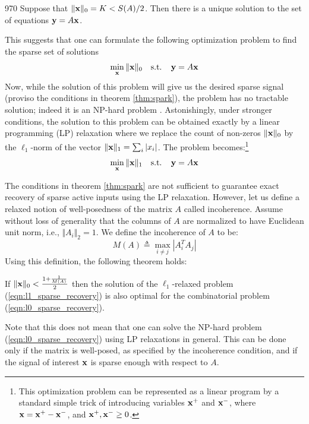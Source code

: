 \begin{theorem}
970\label{thm:spark}
Suppose that $\Vert \mathbf{x} \Vert_0 = K < S(A) / 2$. Then there is a unique solution to the
set of equations $\mathbf{y} = A \mathbf{x}$.
\end{theorem}

This suggests that one can formulate the following optimization problem to find the sparse set of solutions
\begin{equation}
\label{eqn:l0_sparse_recovery}
\min_{\mathbf{x}} \Vert \mathbf{x} \Vert_0  ~~\mbox{ s.t. }~~ \mathbf{y} = A \mathbf{x}
\end{equation}
Now, while the solution of this problem will give us the desired sparse signal (proviso the conditions in
theorem \ref{thm:spark}), the problem has no tractable solution; indeed it is an NP-hard problem \cite{natarajan1995sparse_recovery_complexity}. Astonishingly, under stronger conditions, the solution to this problem can be obtained exactly by a linear
programming (LP) relaxation where we replace the count of non-zeros $\Vert \mathbf{x} \Vert_0$  by the $\ell_1$-norm
of the vector $\Vert \mathbf{x} \Vert_1 = \sum_i | x_i|$. The problem becomes:\footnote{This optimization problem can be represented as a linear
program by a standard simple trick of introducing variables $\mathbf{x}^+$ and $\mathbf{x}^-$, where $\mathbf{x} = \mathbf{x}^+ - \mathbf{x}^-$,
and $\mathbf{x}^+, \mathbf{x}^- \ge 0$. }
\begin{equation}
\label{eqn:l1_sparse_recovery}
\min_{\mathbf{x}} \Vert \mathbf{x} \Vert_1  ~~\mbox{ s.t. }~~ \mathbf{y} = A \mathbf{x}
\end{equation}

The conditions in theorem \ref{thm:spark} are not sufficient to guarantee exact recovery of
sparse active inputs using the LP relaxation. However, let us define a relaxed notion of
well-posedness of the matrix $A$ called incoherence. Assume without loss of generality that
the columns of $A$ are normalized to have Euclidean unit norm, i.e., $\Vert A_i \Vert_2 = 1$.  We define the incoherence of $A$ to be:
\begin{equation}
M(A) \triangleq \max_{i \ne j} | A_i^T A_j |
\end{equation}
Using this definition, the following theorem holds:
\begin{theorem}
\label{thm:incoherence}
If $\Vert \mathbf{x} \Vert_0 < \frac{ 1 + \frac{1}{M(A)}} {2}$ then the solution of the $\ell_1$-relaxed
problem (\ref{eqn:l1_sparse_recovery}) is also optimal for the combinatorial problem
(\ref{eqn:l0_sparse_recovery}).
\end{theorem}

Note that this does not mean that one can solve the NP-hard problem (\ref{eqn:l0_sparse_recovery})
using LP relaxations in general. This can be done only if the matrix is well-posed, as
specified by the incoherence condition, and if the signal of interest $\mathbf{x}$ is sparse enough
with respect to $A$.

